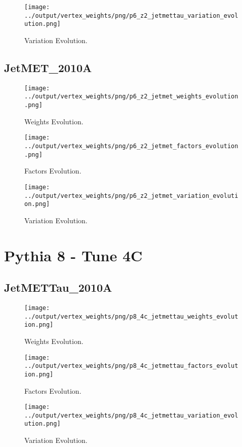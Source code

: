 \documentclass[11pt]{book}
\begin{document}
\begin{figure}[ht]
\centering
\texttt{[image: ../output/vertex\_weights/png/p6\_z2\_jetmettau\_variation\_evolution.png]}
\caption{Variation Evolution.}
\end{figure}
\clearpage


\subsection{JetMET\_2010A}
\begin{figure}[ht]
\centering
\texttt{[image: ../output/vertex\_weights/png/p6\_z2\_jetmet\_weights\_evolution.png]}
\caption{Weights Evolution.}
\end{figure}

\begin{figure}[ht]
\centering
\texttt{[image: ../output/vertex\_weights/png/p6\_z2\_jetmet\_factors\_evolution.png]}
\caption{Factors Evolution.}
\end{figure}

\begin{figure}[ht]
\centering
\texttt{[image: ../output/vertex\_weights/png/p6\_z2\_jetmet\_variation\_evolution.png]}
\caption{Variation Evolution.}
\end{figure}
\clearpage


\section{Pythia 8 - Tune 4C}
\subsection{JetMETTau\_2010A}
\begin{figure}[ht]
\centering
\texttt{[image: ../output/vertex\_weights/png/p8\_4c\_jetmettau\_weights\_evolution.png]}
\caption{Weights Evolution.}
\end{figure}

\begin{figure}[ht]
\centering
\texttt{[image: ../output/vertex\_weights/png/p8\_4c\_jetmettau\_factors\_evolution.png]}
\caption{Factors Evolution.}
\end{figure}

\begin{figure}[ht]
\centering
\texttt{[image: ../output/vertex\_weights/png/p8\_4c\_jetmettau\_variation\_evolution.png]}
\caption{Variation Evolution.}
\end{figure}
\clearpage
\end{document}

